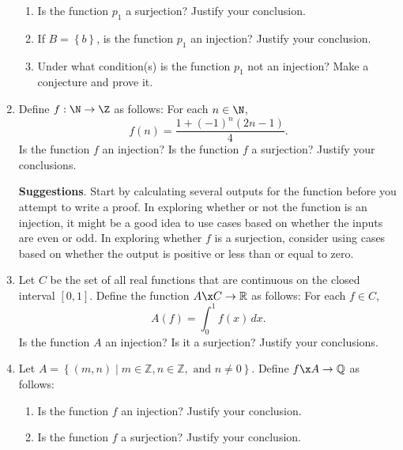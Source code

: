 \begin{enumerate}
\begin{enumerate}
  \item Is the function  $p_1 $ a surjection? Justify your conclusion.

  \item If  $B = \left\{ b \right\}$, is the function  $p_1 $ an injection?  Justify your conclusion.

  \item Under what condition(s) is the function  $p_1 $ not an injection?  Make a conjecture and prove it.
\end{enumerate}




\item Define $f:\N \to \Z$ as follows: For each $n \in \N$,
\[
f(n) = \dfrac{1 + (-1)^n (2n - 1)}{4}.
\]
Is the function $f$ an injection?  Is the function $f$ a surjection?  Justify your conclusions.

\newpar
\textbf{Suggestions}.  Start by calculating several outputs for the function before you attempt to write a proof.  In exploring whether or not the function is an injection, it might be a good idea to use cases based on whether the inputs are even or odd.  In exploring whether $f$ is a surjection, consider using cases based on whether the output is positive or less than or equal to zero.


\item Let $C$ be the set of all real functions that are continuous on the closed interval 
$\left[ 0, 1 \right]$.  Define the function $A\x C \to \mathbb{R}$ as follows:
For each $f \in C$, 
\[
A ( f ) = \int_0^1 {f( x ) \, dx}.
\]
Is the function $A$ an injection?  Is it a surjection?  Justify your conclusions.


\item Let $A = \left\{ ( m, n ) \mid m \in \mathbb{Z}, n \in \mathbb{Z}, \text{ and } n \ne 0 \right\}$.  Define $f\x A \to \mathbb{Q}$ as follows:


\begin{enumerate}
\item Is the function $f$ an injection?  Justify your conclusion.
\item Is the function $f$ a surjection?  Justify your conclusion.
\end{enumerate}



\end{enumerate}

